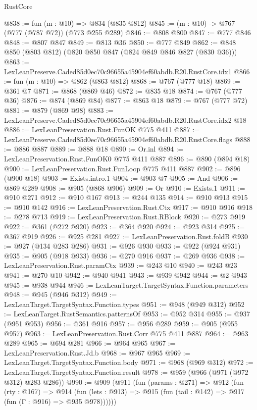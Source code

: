 \begin{lexlean}{RustCore}
\begin{coremodule}
@838 := fun (m : @10) => @834 (@835 @812)
@845 := (m : @10) -> @767 (@777 (@787 @72)) (@773 @255 @289)
@846 := @808 @800
@847 := @777 @846
@848 := @807 @847
@849 := @813 @36
@850 := @777 @849
@862 := @848 @850 (@803 @812) (@820 @850 @847 (@824 @849 @846 @827 (@830 @36)))
@863 := LexLeanPreserve.Caded85d0ec70c96655a45904ef60abdb.R20.RustCore.idx1
@866 := fun (m : @10) => @862 (@863 @812)
@868 := @767 (@777 @18)
@869 := @361 @7
@871 := @868 (@869 @46)
@872 := @835 @18
@874 := @767 (@777 @36)
@876 := @874 (@869 @84)
@877 := @863 @18
@879 := @767 (@777 @72)
@881 := @879 (@869 @98)
@883 := LexLeanPreserve.Caded85d0ec70c96655a45904ef60abdb.R20.RustCore.idx2 @18
@886 := LexLeanPreservation.Rust.FunOK @775 @411
@887 := LexLeanPreserve.Caded85d0ec70c96655a45904ef60abdb.R20.RustCore.flags
@888 := @886 @887
@889 := @888 @18
@890 := Or.inl
@894 := LexLeanPreservation.Rust.FunOK0 @775 @411 @887
@896 := @890 (@894 @18)
@900 := LexLeanPreservation.Rust.FunLoop @775 @411 @887
@902 := @896 (@900 @18)
@903 := Exists.intro.{1}
@904 := @903 @7
@905 := And
@906 := @869 @289
@908 := @905 (@868 @906)
@909 := Or
@910 := Exists.{1}
@911 := @910 @271
@912 := @910 @167
@913 := @244 @135
@914 := @910 @913
@915 := @910 @142
@916 := LexLeanPreservation.Rust.Ctx
@917 := @910 @916
@918 := @278 @713
@919 := LexLeanPreservation.Rust.RBlock
@920 := @273 @919
@922 := @361 (@272 @920)
@923 := @364 @920
@924 := @923 @314
@925 := @367 @919
@926 := @925 @281
@927 := LexLeanPreservation.Rust.foldB
@930 := @927 (@134 @283 @286)
@931 := @926 @930
@933 := @922 (@924 @931)
@935 := @905 (@918 @933)
@936 := @270 @916
@937 := @269 @936
@938 := LexLeanPreservation.Rust.paramCtx
@939 := @243 @10
@940 := @243 @23
@941 := @270 @10
@942 := @940 @941
@943 := @939 @942
@944 := @2 @943
@945 := @938 @944
@946 := LexLeanTarget.TargetSyntax.Function.parameters
@948 := @945 (@946 @312)
@949 := LexLeanTarget.TargetSyntax.Function.types
@951 := @948 (@949 @312)
@952 := LexLeanTarget.RustSemantics.patternsOf
@953 := @952 @314
@955 := @937 (@951 @953)
@956 := @361 @916
@957 := @956 @289
@959 := @905 (@955 @957)
@963 := LexLeanPreservation.Rust.Corr @775 @411 @887
@964 := @963 @289
@965 := @694 @281
@966 := @964 @965
@967 := LexLeanPreservation.Rust.Jd.b
@968 := @967 @965
@969 := LexLeanTarget.TargetSyntax.Function.body
@971 := @968 (@969 @312)
@972 := LexLeanTarget.TargetSyntax.Function.result
@978 := @959 (@966 (@971 (@972 @312) @283 @286))
@990 := @909
    (@911
      (fun (params : @271) =>
      @912
        (fun (rty : @167) =>
        @914
          (fun (lets : @913) => @915 (fun (tail : @142) => @917 (fun (Γ : @916) => @935 @978))))))

\end{coremodule}
\end{lexlean}
